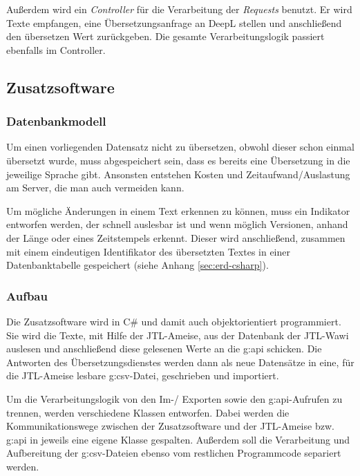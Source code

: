 Außerdem wird ein \emph{Controller} für die Verarbeitung der \emph{Requests} benutzt.
Er wird Texte empfangen, eine Übersetzungsanfrage an DeepL stellen und anschließend den übersetzen Wert zurückgeben.
Die gesamte Verarbeitungslogik passiert ebenfalls im Controller.

\subsection{Zusatzsoftware}
\subsubsection{Datenbankmodell}
Um einen vorliegenden Datensatz nicht zu übersetzen, obwohl dieser schon einmal übersetzt wurde, muss abgespeichert sein, dass es bereits eine Übersetzung in die jeweilige Sprache gibt. 
Ansonsten entstehen Kosten und Zeitaufwand/Auslastung am Server, die man auch vermeiden kann.

Um mögliche Änderungen in einem Text erkennen zu können, muss ein Indikator entworfen werden, der schnell auslesbar ist und wenn möglich Versionen, anhand der Länge oder eines Zeitstempels erkennt.
Dieser wird anschließend, zusammen mit einem eindeutigen Identifikator des übersetzten Textes in einer Datenbanktabelle gespeichert (siehe Anhang \ref{sec:erd-csharp}).

\subsubsection{Aufbau}
Die Zusatzsoftware wird in C\# und damit auch objektorientiert programmiert. 
Sie wird die Texte, mit Hilfe der JTL-Ameise, aus der Datenbank der JTL-Wawi auslesen und anschließend diese gelesenen Werte an die \gls{g:api} schicken.
Die Antworten des Übersetzungsdienstes werden dann als neue Datensätze in eine, für die JTL-Ameise lesbare \gls{g:csv}-Datei, geschrieben und importiert.

Um die Verarbeitungslogik von den Im-/ Exporten sowie den \gls{g:api}-Aufrufen zu trennen, werden verschiedene Klassen entworfen.
Dabei werden die Kommunikationswege zwischen der Zusatzsoftware und der JTL-Ameise bzw. \gls{g:api} in jeweils eine eigene Klasse gespalten. 
Außerdem soll die Verarbeitung und Aufbereitung der \gls{g:csv}-Dateien ebenso vom restlichen Programmcode separiert werden. 
